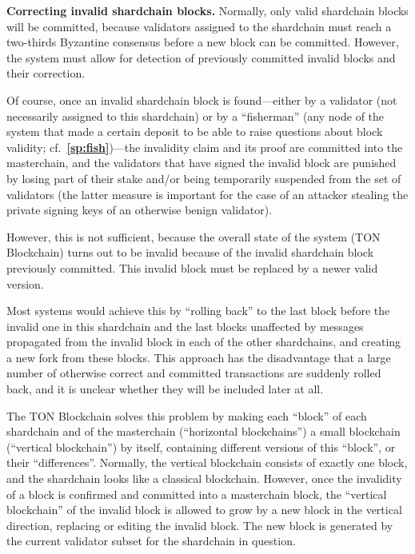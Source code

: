 \documentclass[12pt,oneside]{article}
\def\makepoint#1{\medbreak\noindent{\bf #1.\ }}
\def\nxsubpoint{\refstepcounter{subsubsection}%
  \smallbreak\makepoint{\thesubsubsection}}
\def\refpoint#1{{\rm\textbf{\ref{#1}}}}
\let\ptref=\refpoint
\def\embt(#1.){\textbf{#1.}}
\begin{document}
\nxsubpoint\label{sp:inv.sh.blk.corr} \embt(Correcting invalid
shardchain blocks.)  Normally, only valid shardchain blocks will be
committed, because validators assigned to the shardchain must reach a
two-thirds Byzantine consensus before a new block can be
committed. However, the system must allow for detection of previously
committed invalid blocks and their correction.

Of course, once an invalid shardchain block is found---either by a
validator (not necessarily assigned to this shardchain) or by a
``fisherman'' (any node of the system that made a certain deposit to
be able to raise questions about block validity;
cf.~\ptref{sp:fish})---the invalidity claim and its proof are
committed into the masterchain, and the validators that have signed
the invalid block are punished by losing part of their stake and/or
being temporarily suspended from the set of validators (the latter
measure is important for the case of an attacker stealing the private
signing keys of an otherwise benign validator).

However, this is not sufficient, because the overall state of the
system (TON Block\-chain) turns out to be invalid because of the
invalid shardchain block previously committed. This invalid block must
be replaced by a newer valid version.

Most systems would achieve this by ``rolling back'' to the last block
before the invalid one in this shardchain and the last blocks
unaffected by messages propagated from the invalid block in each of
the other shardchains, and creating a new fork from these blocks. This
approach has the disadvantage that a large number of otherwise correct
and committed transactions are suddenly rolled back, and it is unclear
whether they will be included later at all.

The TON Blockchain solves this problem by making each ``block'' of
each shardchain and of the masterchain (``horizontal blockchains'') a
small blockchain (``vertical blockchain'') by itself, containing
different versions of this ``block'', or their
``differences''. Normally, the vertical blockchain consists of exactly
one block, and the shardchain looks like a classical
blockchain. However, once the invalidity of a block is confirmed and
committed into a masterchain block, the ``vertical blockchain'' of the
invalid block is allowed to grow by a new block in the vertical
direction, replacing or editing the invalid block. The new block is
generated by the current validator subset for the shardchain in
question.
\end{document}
